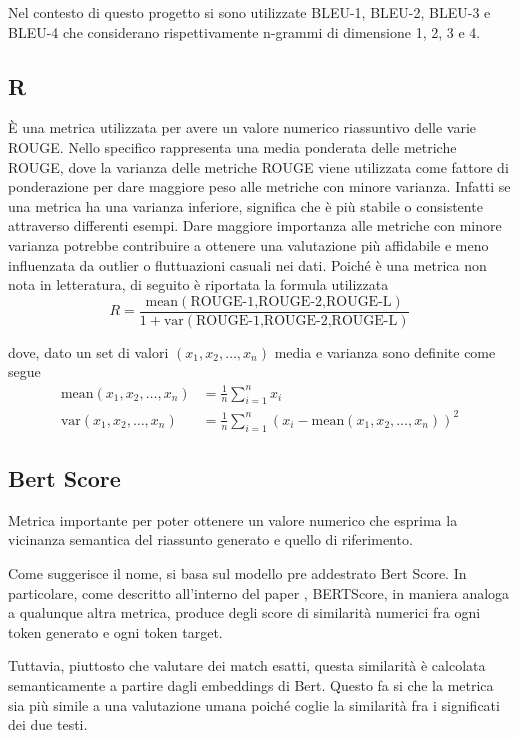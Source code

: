 \documentclass[12pt,a4paper,twoside,openright]{book}
\begin{document}
Nel contesto di questo progetto si sono utilizzate BLEU-1, BLEU-2, BLEU-3 e BLEU-4 che considerano rispettivamente n-grammi di dimensione 1, 2, 3 e 4.


\subsection{R}

È una metrica utilizzata per avere un valore numerico riassuntivo delle varie ROUGE. Nello specifico rappresenta una media ponderata delle metriche ROUGE, dove la varianza delle metriche ROUGE viene utilizzata come fattore di ponderazione per dare maggiore peso alle metriche con minore varianza. Infatti se una metrica ha una varianza inferiore, significa che è più stabile o consistente attraverso differenti esempi. Dare maggiore importanza alle metriche con minore varianza potrebbe contribuire a ottenere una valutazione più affidabile e meno influenzata da outlier o fluttuazioni casuali nei dati.
Poiché è una metrica non nota in letteratura, di seguito è riportata la formula utilizzata
\begin{equation*}
    R = \frac{\text{mean}(\text{ROUGE-1,ROUGE-2,ROUGE-L})}{1+\text{var}(\text{ROUGE-1,ROUGE-2,ROUGE-L})}
\end{equation*}

dove, dato un set di valori $(x_1, x_2, \dots, x_n)$ media e varianza sono definite come segue
\begin{align*}
    \text{mean}(x_1, x_2, \dots, x_n) &= \frac{1}{n} \sum_{i=1}^n x_i \\
    \text{var}(x_1, x_2, \dots, x_n) &= \frac{1}{n} \sum_{i=1}^n (x_i - \text{mean}(x_1, x_2, \dots, x_n))^2
\end{align*}

\subsection{Bert Score}
Metrica importante per poter ottenere un valore numerico che esprima la vicinanza semantica del riassunto generato e quello di riferimento. 

Come suggerisce il nome, si basa sul modello pre addestrato Bert Score. In particolare, come descritto all'interno del paper \cite{zhang2020bertscore}, BERTScore, in maniera analoga a qualunque altra metrica, produce degli score di similarità numerici fra ogni token generato e ogni token target. 

Tuttavia, piuttosto che valutare dei match esatti, questa similarità è calcolata semanticamente a partire dagli embeddings di Bert. Questo fa si che la metrica sia più simile a una valutazione umana poiché coglie la similarità fra i significati dei due testi.
\end{document}
